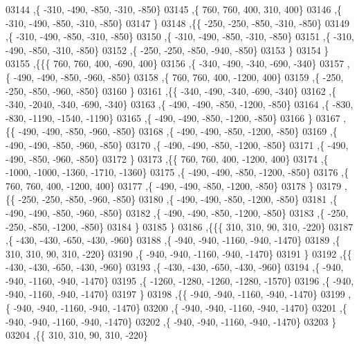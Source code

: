\begin{DoxyCode}
03144     ,\{  -310,  -490,  -850,  -310,  -850\}
03145     ,\{   760,   760,   400,   310,   400\}
03146     ,\{  -310,  -490,  -850,  -310,  -850\}
03147     \}
03148    ,\{\{  -250,  -250,  -850,  -310,  -850\}
03149     ,\{  -310,  -490,  -850,  -310,  -850\}
03150     ,\{  -310,  -490,  -850,  -310,  -850\}
03151     ,\{  -310,  -490,  -850,  -310,  -850\}
03152     ,\{  -250,  -250,  -850,  -940,  -850\}
03153     \}
03154    \}
03155   ,\{\{\{   760,   760,   400,  -690,   400\}
03156     ,\{  -340,  -490,  -340,  -690,  -340\}
03157     ,\{  -490,  -490,  -850,  -960,  -850\}
03158     ,\{   760,   760,   400, -1200,   400\}
03159     ,\{  -250,  -250,  -850,  -960,  -850\}
03160     \}
03161    ,\{\{  -340,  -490,  -340,  -690,  -340\}
03162     ,\{  -340, -2040,  -340,  -690,  -340\}
03163     ,\{  -490,  -490,  -850, -1200,  -850\}
03164     ,\{  -830,  -830, -1190, -1540, -1190\}
03165     ,\{  -490,  -490,  -850, -1200,  -850\}
03166     \}
03167    ,\{\{  -490,  -490,  -850,  -960,  -850\}
03168     ,\{  -490,  -490,  -850, -1200,  -850\}
03169     ,\{  -490,  -490,  -850,  -960,  -850\}
03170     ,\{  -490,  -490,  -850, -1200,  -850\}
03171     ,\{  -490,  -490,  -850,  -960,  -850\}
03172     \}
03173    ,\{\{   760,   760,   400, -1200,   400\}
03174     ,\{ -1000, -1000, -1360, -1710, -1360\}
03175     ,\{  -490,  -490,  -850, -1200,  -850\}
03176     ,\{   760,   760,   400, -1200,   400\}
03177     ,\{  -490,  -490,  -850, -1200,  -850\}
03178     \}
03179    ,\{\{  -250,  -250,  -850,  -960,  -850\}
03180     ,\{  -490,  -490,  -850, -1200,  -850\}
03181     ,\{  -490,  -490,  -850,  -960,  -850\}
03182     ,\{  -490,  -490,  -850, -1200,  -850\}
03183     ,\{  -250,  -250,  -850, -1200,  -850\}
03184     \}
03185    \}
03186   ,\{\{\{   310,   310,    90,   310,  -220\}
03187     ,\{  -430,  -430,  -650,  -430,  -960\}
03188     ,\{  -940,  -940, -1160,  -940, -1470\}
03189     ,\{   310,   310,    90,   310,  -220\}
03190     ,\{  -940,  -940, -1160,  -940, -1470\}
03191     \}
03192    ,\{\{  -430,  -430,  -650,  -430,  -960\}
03193     ,\{  -430,  -430,  -650,  -430,  -960\}
03194     ,\{  -940,  -940, -1160,  -940, -1470\}
03195     ,\{ -1260, -1280, -1260, -1280, -1570\}
03196     ,\{  -940,  -940, -1160,  -940, -1470\}
03197     \}
03198    ,\{\{  -940,  -940, -1160,  -940, -1470\}
03199     ,\{  -940,  -940, -1160,  -940, -1470\}
03200     ,\{  -940,  -940, -1160,  -940, -1470\}
03201     ,\{  -940,  -940, -1160,  -940, -1470\}
03202     ,\{  -940,  -940, -1160,  -940, -1470\}
03203     \}
03204    ,\{\{   310,   310,    90,   310,  -220\}

\end{DoxyCode}
